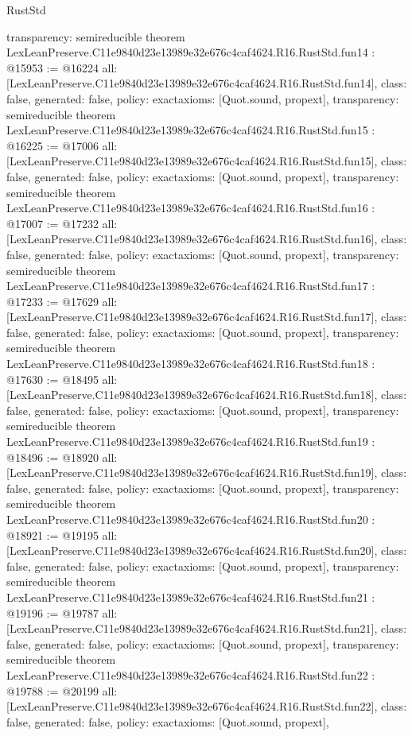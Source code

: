 \begin{lexlean}{RustStd}
\begin{coremodule}
{  transparency: semireducible
}
theorem LexLeanPreserve.C11e9840d23e13989e32e676c4caf4624.R16.RustStd.fun14 : @15953 := @16224 {
  all: [LexLeanPreserve.C11e9840d23e13989e32e676c4caf4624.R16.RustStd.fun14],
  class: false,
  generated: false,
  policy: exact{axioms: [Quot.sound, propext]},
  transparency: semireducible
}
theorem LexLeanPreserve.C11e9840d23e13989e32e676c4caf4624.R16.RustStd.fun15 : @16225 := @17006 {
  all: [LexLeanPreserve.C11e9840d23e13989e32e676c4caf4624.R16.RustStd.fun15],
  class: false,
  generated: false,
  policy: exact{axioms: [Quot.sound, propext]},
  transparency: semireducible
}
theorem LexLeanPreserve.C11e9840d23e13989e32e676c4caf4624.R16.RustStd.fun16 : @17007 := @17232 {
  all: [LexLeanPreserve.C11e9840d23e13989e32e676c4caf4624.R16.RustStd.fun16],
  class: false,
  generated: false,
  policy: exact{axioms: [Quot.sound, propext]},
  transparency: semireducible
}
theorem LexLeanPreserve.C11e9840d23e13989e32e676c4caf4624.R16.RustStd.fun17 : @17233 := @17629 {
  all: [LexLeanPreserve.C11e9840d23e13989e32e676c4caf4624.R16.RustStd.fun17],
  class: false,
  generated: false,
  policy: exact{axioms: [Quot.sound, propext]},
  transparency: semireducible
}
theorem LexLeanPreserve.C11e9840d23e13989e32e676c4caf4624.R16.RustStd.fun18 : @17630 := @18495 {
  all: [LexLeanPreserve.C11e9840d23e13989e32e676c4caf4624.R16.RustStd.fun18],
  class: false,
  generated: false,
  policy: exact{axioms: [Quot.sound, propext]},
  transparency: semireducible
}
theorem LexLeanPreserve.C11e9840d23e13989e32e676c4caf4624.R16.RustStd.fun19 : @18496 := @18920 {
  all: [LexLeanPreserve.C11e9840d23e13989e32e676c4caf4624.R16.RustStd.fun19],
  class: false,
  generated: false,
  policy: exact{axioms: [Quot.sound, propext]},
  transparency: semireducible
}
theorem LexLeanPreserve.C11e9840d23e13989e32e676c4caf4624.R16.RustStd.fun20 : @18921 := @19195 {
  all: [LexLeanPreserve.C11e9840d23e13989e32e676c4caf4624.R16.RustStd.fun20],
  class: false,
  generated: false,
  policy: exact{axioms: [Quot.sound, propext]},
  transparency: semireducible
}
theorem LexLeanPreserve.C11e9840d23e13989e32e676c4caf4624.R16.RustStd.fun21 : @19196 := @19787 {
  all: [LexLeanPreserve.C11e9840d23e13989e32e676c4caf4624.R16.RustStd.fun21],
  class: false,
  generated: false,
  policy: exact{axioms: [Quot.sound, propext]},
  transparency: semireducible
}
theorem LexLeanPreserve.C11e9840d23e13989e32e676c4caf4624.R16.RustStd.fun22 : @19788 := @20199 {
  all: [LexLeanPreserve.C11e9840d23e13989e32e676c4caf4624.R16.RustStd.fun22],
  class: false,
  generated: false,
  policy: exact{axioms: [Quot.sound, propext]},
}
\end{coremodule}
\end{lexlean}
